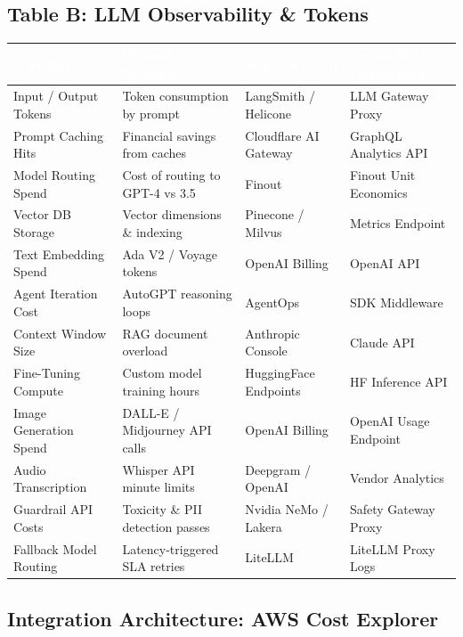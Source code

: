 \documentclass[11pt,a4paper]{article}
\begin{document}
\subsection{Table B: LLM Observability \& Tokens}
\begin{table}[H]
\centering
\renewcommand{\arraystretch}{1.4}
\begin{tabularx}{\textwidth}{| >{\raggedright\arraybackslash}X >{\raggedright\arraybackslash}X >{\raggedright\arraybackslash}p{3cm} >{\raggedright\arraybackslash}X |}
\hline
\rowcolor{dpiteal} \textcolor{white}{\textbf{Cost Data}} & \textcolor{white}{\textbf{What It Measures}} & \textcolor{white}{\textbf{Source System}} & \textcolor{white}{\textbf{Actual Data Comes From}} \\
\hline
Input / Output Tokens & Token consumption by prompt & LangSmith / Helicone & LLM Gateway Proxy \\
Prompt Caching Hits & Financial savings from caches & Cloudflare AI Gateway & GraphQL Analytics API \\
Model Routing Spend & Cost of routing to GPT-4 vs 3.5 & Finout & Finout Unit Economics \\
Vector DB Storage & Vector dimensions \& indexing & Pinecone / Milvus & Metrics Endpoint \\
Text Embedding Spend & Ada V2 / Voyage tokens & OpenAI Billing & OpenAI API \\
Agent Iteration Cost & AutoGPT reasoning loops & AgentOps & SDK Middleware \\
Context Window Size & RAG document overload & Anthropic Console & Claude API \\
Fine-Tuning Compute & Custom model training hours & HuggingFace Endpoints & HF Inference API \\
Image Generation Spend & DALL-E / Midjourney API calls & OpenAI Billing & OpenAI Usage Endpoint \\
Audio Transcription & Whisper API minute limits & Deepgram / OpenAI & Vendor Analytics \\
Guardrail API Costs & Toxicity \& PII detection passes & Nvidia NeMo / Lakera & Safety Gateway Proxy \\
Fallback Model Routing & Latency-triggered SLA retries & LiteLLM & LiteLLM Proxy Logs \\
\hline
\end{tabularx}
\end{table}

\subsection{Integration Architecture: AWS Cost Explorer}
\end{document}
